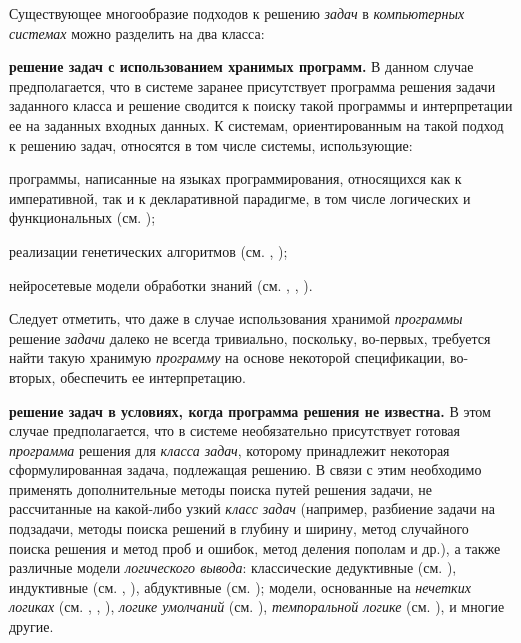 Существующее многообразие подходов к решению \textit{задач} в \textit{компьютерных системах} можно разделить на два класса:
\begin{textitemize}
	\item \textbf{решение задач с использованием хранимых программ.} В данном случае предполагается, что в системе заранее присутствует программа решения задачи заданного класса и решение сводится к поиску такой программы и интерпретации ее на заданных входных данных. К системам, ориентированным на такой подход к решению задач, относятся в том числе системы, использующие:
	\begin{textitemize}
		\item программы, написанные на языках программирования, относящихся как к императивной, так и к декларативной парадигме, в том числе логических и функциональных (см. );
		\item реализации генетических алгоритмов (см. , );
		\item нейросетевые модели обработки знаний (см. , , ).
	\end{textitemize}	
	\vspace{-2\parskip}
	Следует отметить, что даже в случае использования хранимой \textit{программы} решение \textit{задачи} далеко не всегда тривиально, поскольку, во-первых, требуется найти такую хранимую \textit{программу} на основе некоторой спецификации, во-вторых, обеспечить ее интерпретацию.
	\vspace{\parskip}
	\item \textbf{решение задач в условиях, когда программа решения не известна.} В этом случае предполагается, что в системе необязательно присутствует готовая \textit{программа} решения для \textit{класса задач}, которому принадлежит некоторая сформулированная задача, подлежащая решению. В связи с этим необходимо применять дополнительные методы поиска путей решения задачи, не рассчитанные на какой-либо узкий \textit{класс задач} (например, разбиение задачи на подзадачи, методы поиска решений в глубину и ширину, метод случайного поиска решения и метод проб и ошибок, метод деления пополам и др.), а также различные модели \textit{логического вывода}: классические дедуктивные (см. ), индуктивные (см. , ), абдуктивные (см. ); модели, основанные на \textit{нечетких логиках} (см. , , ), \textit{логике умолчаний} (см. ), \textit{темпоральной логике} (см. ), и многие другие.
\end{textitemize}

